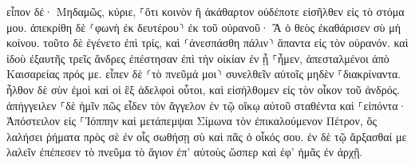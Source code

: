 \documentclass{openreader}
\begin{document}
εἶπον δέ· Μηδαμῶς, κύριε, ⸀ὅτι κοινὸν ἢ ἀκάθαρτον οὐδέποτε εἰσῆλθεν εἰς τὸ στόμα μου. 
ἀπεκρίθη δὲ ⸂φωνὴ ἐκ δευτέρου⸃ ἐκ τοῦ οὐρανοῦ· Ἃ ὁ θεὸς ἐκαθάρισεν σὺ μὴ κοίνου. 
τοῦτο δὲ ἐγένετο ἐπὶ τρίς, καὶ ⸂ἀνεσπάσθη πάλιν⸃ ἅπαντα εἰς τὸν οὐρανόν. 
καὶ ἰδοὺ ἐξαυτῆς τρεῖς ἄνδρες ἐπέστησαν ἐπὶ τὴν οἰκίαν ἐν ᾗ ⸀ἦμεν, ἀπεσταλμένοι ἀπὸ Καισαρείας πρός με. 
εἶπεν δὲ ⸂τὸ πνεῦμά μοι⸃ συνελθεῖν αὐτοῖς μηδὲν ⸀διακρίναντα. ἦλθον δὲ σὺν ἐμοὶ καὶ οἱ ἓξ ἀδελφοὶ οὗτοι, καὶ εἰσήλθομεν εἰς τὸν οἶκον τοῦ ἀνδρός. 
ἀπήγγειλεν ⸀δὲ ἡμῖν πῶς εἶδεν τὸν ἄγγελον ἐν τῷ οἴκῳ αὐτοῦ σταθέντα καὶ ⸀εἰπόντα· Ἀπόστειλον εἰς ⸀Ἰόππην καὶ μετάπεμψαι Σίμωνα τὸν ἐπικαλούμενον Πέτρον, 
ὃς λαλήσει ῥήματα πρὸς σὲ ἐν οἷς σωθήσῃ σὺ καὶ πᾶς ὁ οἶκός σου. 
ἐν δὲ τῷ ἄρξασθαί με λαλεῖν ἐπέπεσεν τὸ πνεῦμα τὸ ἅγιον ἐπ’ αὐτοὺς ὥσπερ καὶ ἐφ’ ἡμᾶς ἐν ἀρχῇ. 
\end{document}
